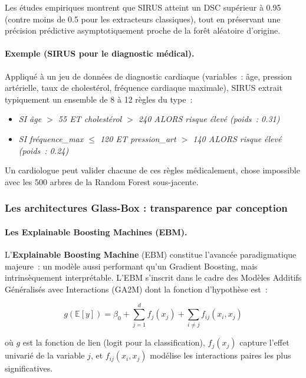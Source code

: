 Les études empiriques montrent que SIRUS atteint un DSC supérieur à 0.95 (contre moins
de 0.5 pour les extracteurs classiques), tout en préservant une précision prédictive
asymptotiquement proche de la forêt aléatoire d'origine.

\paragraph{Exemple (SIRUS pour le diagnostic médical).}
Appliqué à un jeu de données de diagnostic cardiaque (variables~: âge, pression artérielle,
taux de cholestérol, fréquence cardiaque maximale), SIRUS extrait typiquement un ensemble
de 8 à 12 règles du type~:
\begin{itemize}
  \item \textit{SI âge $>$ 55 ET cholestérol $>$ 240 ALORS risque élevé (poids~: 0.31)}
  \item \textit{SI fréquence\_max $\leq$ 120 ET pression\_art $>$ 140 ALORS risque élevé (poids~: 0.24)}
\end{itemize}
Un cardiologue peut valider chacune de ces règles médicalement, chose impossible avec les
500 arbres de la Random Forest sous-jacente.

\subsubsection{Les architectures Glass-Box : transparence par conception}

\paragraph{Les Explainable Boosting Machines (EBM).}

L'\textbf{Explainable Boosting Machine} (EBM) constitue l'avancée paradigmatique majeure~:
un modèle aussi performant qu'un Gradient Boosting, mais intrinsèquement interprétable.
L'EBM s'inscrit dans le cadre des Modèles Additifs Généralisés avec Interactions (GA2M)
dont la fonction d'hypothèse est~:

\begin{equation}
  g\!\left(\mathbb{E}[y]\right) = \beta_0 + \sum_{j=1}^{d} f_j(x_j) + \sum_{i \neq j} f_{ij}(x_i, x_j)
  \label{eq:ebm}
\end{equation}

où $g$ est la fonction de lien (logit pour la classification), $f_j(x_j)$ capture l'effet
univarié de la variable $j$, et $f_{ij}(x_i, x_j)$ modélise les interactions paires
les plus significatives.

